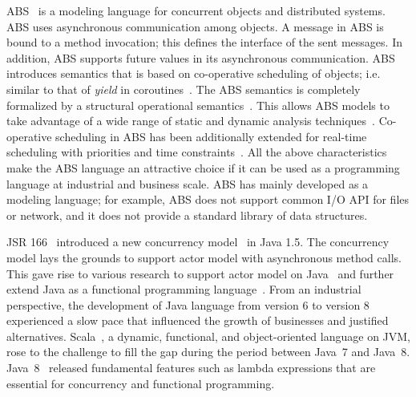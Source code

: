 ABS~\cite{johnsen2012abs,hahnlehjlssw11} is a modeling language for concurrent objects and distributed systems.
ABS uses asynchronous communication among objects.
A message in ABS is bound to a method invocation;
this defines the interface of the sent messages.
In addition, ABS supports future values in its asynchronous communication.
ABS introduces  semantics that is based on co-operative scheduling of objects; 
i.e. similar to that of \emph{yield} in coroutines~\cite{creol:broch:owe}.
The ABS semantics is completely formalized by a structural operational semantics~\cite{plotkin:sos,abs:2012}.
This allows ABS models to take advantage of a wide range of static and dynamic analysis techniques~\cite{DBLP:journals/sttt/WongBBGGHMS15,DBLP:conf/cade/DinBH15,DBLP:conf/ifm/GiachinoGLLW13,DBLP:conf/tacas/AlbertAFGGMPR14}.
% 
Co-operative scheduling in ABS has been additionally extended for real-time scheduling with priorities and time constraints~\cite{bjork2013:rtabs,johnsen2012modeling}.
All the above characteristics make the ABS language an attractive choice if it
can be used as a programming language at industrial and business scale.
ABS has mainly developed as a modeling language;
for example, ABS does not support common I/O API for files or network,
and it does not provide a standard library of data structures.

JSR 166~\cite{jsr166} introduced a new concurrency model~\cite{DBLP:conf/java/Lea00} in Java 1.5.
The concurrency model lays the grounds to support actor model with asynchronous method calls.
This gave rise to various research to support actor model on Java~\cite{actor_frameworks_jvm:agha} and further extend Java as a functional programming language~\cite{odersky1997pizza,henkel2003discovering,nystrom2003polyglot,bracha1998making}.
From an industrial perspective, the development of Java language from version 6 to version 8 experienced a slow pace that influenced the growth of businesses and justified alternatives.
Scala~\cite{odersky2004scala}, a dynamic, functional, and object-oriented language on JVM, rose to the challenge to fill the gap during the period between Java~7 and Java~8.
Java~8~\cite{jls8} released fundamental features such as lambda expressions that are essential for concurrency and functional programming.

